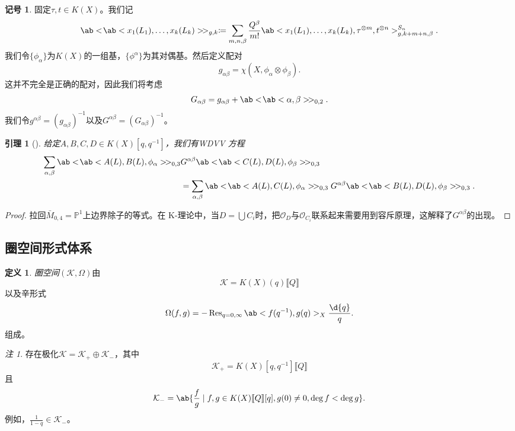 \documentclass{amsart}
\newtheorem{lem}[thm]{引理}
\theoremstyle{definition}
\newtheorem{defn}[thm]{定义}
\newtheorem{notn}[thm]{记号}
\theoremstyle{remark}
\newtheorem{rmk}[thm]{注}
\theoremstyle{plain}
\theoremstyle{definition}
\theoremstyle{remark}
\renewcommand{\P}{\mathbb{P}}
\newcommand{\mc}[1]{\mathcal{#1}}
\newcommand{\on}[1]{\operatorname{#1}}
\newcommand{\1}{\mathbf{1}}
\newcommand{\2}{\mathbf{2}}
\newcommand{\3}{\mathbf{3}}
\newcommand{\ps}[1]{\llbracket #1 \rrbracket}
\begin{document}
\begin{notn}
    固定\(\tau, t \in K(X)\)。我们记
    \[ \ab<\!\ab<x_1(L_1), \ldots, x_k(L_k)>\!>_{g,k} \coloneqq \sum_{m,n,\beta} \frac{Q^{\beta}}{m!} \ab<x_1(L_1), \ldots, x_k(L_k), \tau^{\otimes m}, t^{\otimes n}>_{g,k+m+n,\beta}^{S_n}. \]
    我们令\(\{\phi_{\alpha}\}\)为\(K(X)\)的一组基，\(\{\phi^{\alpha}\}\)为其对偶基。然后定义配对
    \[ g_{\alpha\beta} = \chi(X, \phi_{\alpha} \otimes \phi_{\beta}). \]
    这并不完全是正确的配对，因此我们将考虑
    \[ G_{\alpha\beta} = g_{\alpha\beta} + \ab<\!\ab<\alpha,\beta>\!>_{0,2}. \]
    我们令\(g^{\alpha\beta} = (g_{\alpha\beta})^{-1}\)以及\(G^{\alpha\beta} = (G_{\alpha\beta})^{-1}\)。
\end{notn}

\begin{lem}[{\cite{Givental2000K}}]
    给定\(A,B,C,D \in K(X)[q,q^{-1}]\)，我们有\textit{WDVV 方程}
    \begin{align*}
        \sum_{\alpha,\beta} \ab<\!\ab< A(L), B(L), \phi_{\alpha}>\! >_{0,3}& G^{\alpha\beta}\ab<\!\ab< C(L), D(L), \phi_{\beta}>\! >_{0,3} \\
        &= \sum_{\alpha,\beta} \ab<\!\ab< A(L), C(L), \phi_{\alpha}>\! >_{0,3} G^{\alpha\beta}\ab<\!\ab< B(L), D(L), \phi_{\beta}>\! >_{0,3}. 
    \end{align*}
\end{lem}

\begin{proof}
    拉回\(\bar{M}_{0,4} = \P^1\)上边界除子的等式。在 K-理论中，当\(D = \bigcup C_i\)时，把\(\mc{O}_D\)与\(\mc{O}_{C_i}\)联系起来需要用到容斥原理，这解释了\(G^{\alpha\beta}\)的出现。
\end{proof}

\subsection{圈空间形式体系}%
\label{sub:Loop space formalism}

\begin{defn}
    \textit{圈空间}\((\mc{K}, \Omega)\)由
    \[ \mc{K} = K(X)(q) \ps{Q}\]
    以及辛形式
    \[ \Omega(f, g) = - \on{Res}_{q = 0, \infty} \ab<f(q^{-1}), g(q)>_X \frac{\d{q}}{q}. \]
    组成。
\end{defn}

\begin{rmk}
    存在极化\(\mc{K} = \mc{K}_+ \oplus \mc{K}_-\)，其中
    \[ \mc{K}_+ = K(X)[q, q^{-1}]\ps{Q} \]
    且
    \[ \mc{K}_- = \ab\{ \frac{f}{g} \mid f, g \in K(X)\ps{Q}[q], g(0) \neq 0, \deg f < \deg g\}. \]
    例如，\(\frac{1}{1-q} \in \mc{K}_-\)。
\end{rmk}
\end{document}
